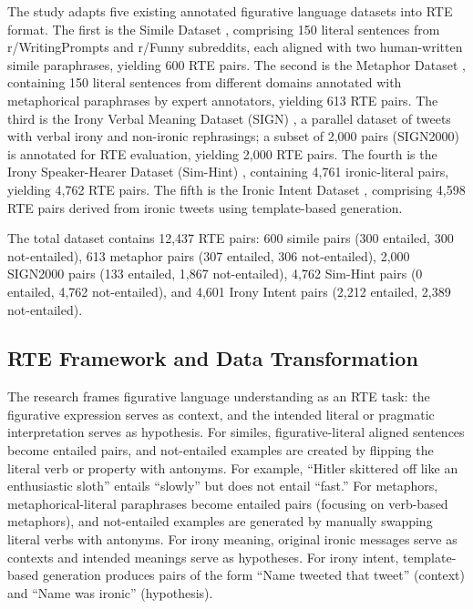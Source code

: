 \documentclass[12pt]{article}
\begin{document}
The study adapts five existing annotated figurative language datasets into RTE format. The first is the Simile Dataset \cite{chakrabarty2020}, comprising 150 literal sentences from r/WritingPrompts and r/Funny subreddits, each aligned with two human-written simile paraphrases, yielding 600 RTE pairs. The second is the Metaphor Dataset \cite{chakrabarty2021}, containing 150 literal sentences from different domains annotated with metaphorical paraphrases by expert annotators, yielding 613 RTE pairs. The third is the Irony Verbal Meaning Dataset (SIGN) \cite{peled2017}, a parallel dataset of tweets with verbal irony and non-ironic rephrasings; a subset of 2,000 pairs (SIGN2000) is annotated for RTE evaluation, yielding 2,000 RTE pairs. The fourth is the Irony Speaker-Hearer Dataset (Sim-Hint) \cite{ghosh2020}, containing 4,761 ironic-literal pairs, yielding 4,762 RTE pairs. The fifth is the Ironic Intent Dataset \cite{vanhee2018}, comprising 4,598 RTE pairs derived from ironic tweets using template-based generation.

The total dataset contains 12,437 RTE pairs: 600 simile pairs (300 entailed, 300 not-entailed), 613 metaphor pairs (307 entailed, 306 not-entailed), 2,000 SIGN2000 pairs (133 entailed, 1,867 not-entailed), 4,762 Sim-Hint pairs (0 entailed, 4,762 not-entailed), and 4,601 Irony Intent pairs (2,212 entailed, 2,389 not-entailed).

\subsection{RTE Framework and Data Transformation}

The research frames figurative language understanding as an RTE task: the figurative expression serves as context, and the intended literal or pragmatic interpretation serves as hypothesis. For similes, figurative-literal aligned sentences become entailed pairs, and not-entailed examples are created by flipping the literal verb or property with antonyms. For example, ``Hitler skittered off like an enthusiastic sloth'' entails ``slowly'' but does not entail ``fast.'' For metaphors, metaphorical-literal paraphrases become entailed pairs (focusing on verb-based metaphors), and not-entailed examples are generated by manually swapping literal verbs with antonyms. For irony meaning, original ironic messages serve as contexts and intended meanings serve as hypotheses. For irony intent, template-based generation produces pairs of the form ``Name tweeted that tweet'' (context) and ``Name was ironic'' (hypothesis).
\end{document}
